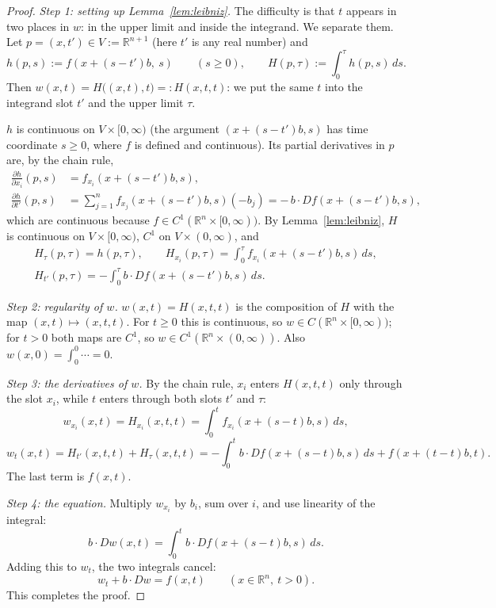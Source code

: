 \documentclass[11pt]{article}
\theoremstyle{plain}
\theoremstyle{definition}
\theoremstyle{remark}
\begin{document}
\begin{proof}
\emph{Step 1: setting up Lemma~\ref{lem:leibniz}.} The difficulty is that $t$ appears in two places in $w$: in the upper limit and inside the integrand. We separate them. Let $p = (x,t') \in V := \mathbb{R}^{n+1}$ (here $t'$ is any real number) and
$$ h(p,s) := f(x + (s - t')b,\ s) \qquad (s \geq 0), \qquad H(p,\tau) := \int_0^\tau h(p,s)\, ds. $$
Then $w(x,t) = H\big((x,t),t\big) =: H(x,t,t)$: we put the same $t$ into the integrand slot $t'$ and the upper limit $\tau$.

$h$ is continuous on $V \times [0,\infty)$ (the argument $(x + (s - t')b, s)$ has time coordinate $s \geq 0$, where $f$ is defined and continuous). Its partial derivatives in $p$ are, by the chain rule,
\begin{align*}
\frac{\partial h}{\partial x_i}(p,s) &= f_{x_i}(x + (s - t')b, s), \\
\frac{\partial h}{\partial t'}(p,s) &= \sum_{j=1}^n f_{x_j}(x + (s - t')b, s)(-b_j) = -\,b\cdot Df(x + (s - t')b, s),
\end{align*}
which are continuous because $f \in C^1(\mathbb{R}^n \times [0,\infty))$. By Lemma~\ref{lem:leibniz}, $H$ is continuous on $V \times [0,\infty)$, $C^1$ on $V \times (0,\infty)$, and
\begin{gather*}
H_\tau(p,\tau) = h(p,\tau), \qquad H_{x_i}(p,\tau) = \int_0^\tau f_{x_i}(x + (s - t')b, s)\, ds, \\
H_{t'}(p,\tau) = -\int_0^\tau b\cdot Df(x + (s - t')b, s)\, ds.
\end{gather*}

\emph{Step 2: regularity of $w$.} $w(x,t) = H(x,t,t)$ is the composition of $H$ with the map $(x,t) \mapsto (x,t,t)$. For $t \ge 0$ this is continuous, so $w \in C(\mathbb{R}^n \times [0,\infty))$; for $t > 0$ both maps are $C^1$, so $w \in C^1(\mathbb{R}^n \times (0,\infty))$. Also $w(x,0) = \int_0^0 \cdots = 0$.

\emph{Step 3: the derivatives of $w$.} By the chain rule, $x_i$ enters $H(x,t,t)$ only through the slot $x_i$, while $t$ enters through both slots $t'$ and $\tau$:
$$ w_{x_i}(x,t) = H_{x_i}(x,t,t) = \int_0^t f_{x_i}(x + (s - t)b, s)\, ds, $$
$$ w_t(x,t) = H_{t'}(x,t,t) + H_\tau(x,t,t) = -\int_0^t b\cdot Df(x + (s - t)b, s)\, ds + f(x + (t - t)b, t). $$
The last term is $f(x,t)$.

\emph{Step 4: the equation.} Multiply $w_{x_i}$ by $b_i$, sum over $i$, and use linearity of the integral:
$$ b\cdot Dw(x,t) = \int_0^t b\cdot Df(x + (s - t)b, s)\, ds. $$
Adding this to $w_t$, the two integrals cancel:
$$ w_t + b\cdot Dw = f(x,t) \qquad (x \in \mathbb{R}^n,\ t > 0). $$
This completes the proof.
\end{proof}
\end{document}

